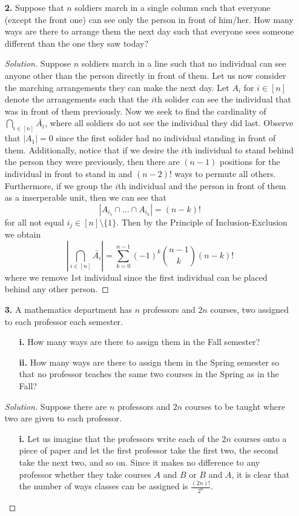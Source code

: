 \documentclass[ 12pt ]{article}
\begin{document}
\begin{enumerate}
	\item[\textbf{2.}] Suppose that $n$ soldiers march in a single column such that everyone (except the front one) can see only the person in front of him/her. How many ways are there
		to arrange them the next day such that everyone sees someone different than the one they saw today?

		\begin{proof}[Solution]
			Suppose $n$ soldiers march in a line such that no individual can see anyone other than the person directly in front of them. Let us now consider the marching arrangements
			they can make the next day. Let $A_i$ for $i \in [n]$ denote the arrangements such that the $i$th solider can see the individual that was in front of them previously.
			Now we seek to find the cardinality of $\bigcap_{i \in [n]} \bar{A_i}$, where all soldiers do not see the individual they did last. Observe that $|A_1| = 0$ since the first
			solider had no individual standing in front of them. Additionally, notice that if we desire the $i$th individual to stand behind the person they were previously, then there
			are $(n-1)$ positions for the individual in front to stand in and $(n-2)!$ ways to permute all others. Furthermore, if we group the $i$th individual and the person in front
			of them as a inserperable unit, then we can see that $$|A_{i_1} \cap \hdots \cap A_{i_k}| = (n-k)!$$ for all not equal $i_j \in [n] \setminus \{ 1 \}$. Then by the
			Principle of Inclusion-Exclusion we obtain $$\left | \bigcap_{i \in [n]} \bar{A_i} \right | = \sum_{k = 0}^{n-1} (-1)^k \binom{n-1}{k} (n-k)!$$ where we remove 1st individual
			since the first individual can be placed behind any other person.
		\end{proof}


	\item[\textbf{3.}] A mathematics department has $n$ professors and $2n$ courses, two assigned to each professor each semester.
		\begin{enumerate}
			\item[\textbf{i.}] How many ways are there to assign them in the Fall semester?
			\item[\textbf{ii.}] How many ways are there to assign them in the Spring semester so that no professor teaches the same two courses in the Spring as in the Fall?
		\end{enumerate}

		\begin{proof}[Solution]
			Suppose there are $n$ professors and $2n$ courses to be taught where two are given to each professor.
			\begin{enumerate}
				\item[\textbf{i.}] Let us imagine that the professors write each of the $2n$ courses onto a piece of paper and let the first professor take the first two, the second take
					the next two, and so on. Since it makes no difference to any professor whether they take courses $A$ and $B$ or $B$ and $A$, it is clear that the number of ways
					classes can be assigned is $\frac{(2n)!}{2^n}$.


\end{enumerate}
\end{proof}
\end{enumerate}
\end{document}
